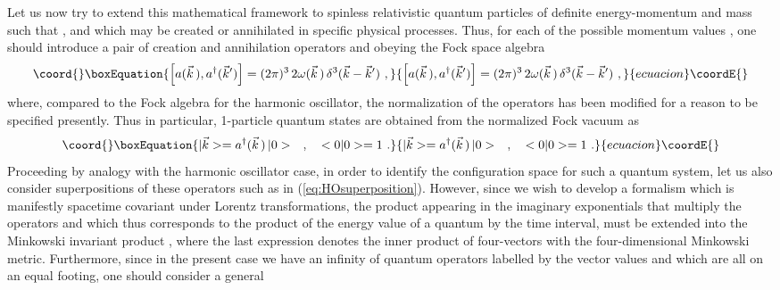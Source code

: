 \documentclass[a4paper,11pt]{article}
\begin{document}
Let us now try to extend this mathematical framework to spinless 
re\-la\-tivistic
quantum particles of definite energy-momentum \coordHE{}
and mass \coordHE{} such that \coordHE{},
and which may be created or annihilated in specific physical processes. 
Thus, for each of the possible
momentum values \coordHE{}, one should introduce a pair of creation
and annihilation operators \coordHE{} and \coordHE{}
obeying the Fock space algebra
\begin{equation}\coord{}\boxEquation{
\left[a(\vec{k}\,),a^\dagger(\vec{k}')\right]=
(2\pi)^3\,2\omega(\vec{k}\,)\,\delta^{3}(\vec{k}-\vec{k}')\ ,
\label{eq:Fockparticle}
}{
\left[a(\vec{k}\,),a^\dagger(\vec{k}')\right]=
(2\pi)^3\,2\omega(\vec{k}\,)\,\delta^{3}(\vec{k}-\vec{k}')\ ,
}{ecuacion}\coordE{}\end{equation}
where, compared to the Fock algebra for the harmonic oscillator,
the normalization of the operators has been modified for a reason
to be specified presently. Thus in particular, 1-particle quantum states
are obtained from the normalized Fock vacuum \coordHE{} as
\begin{equation}\coord{}\boxEquation{
|\vec{k}>=a^\dagger(\vec{k}\,)\,|0>\ \ \ ,\ \ \ 
<0|0>=1\ .
}{
|\vec{k}>=a^\dagger(\vec{k}\,)\,|0>\ \ \ ,\ \ \ 
<0|0>=1\ .
}{ecuacion}\coordE{}\end{equation}
Proceeding by analogy with the harmonic oscillator case, in order
to identify the configuration space for such a quantum system,
let us also consider superpositions of these operators such as in
(\ref{eq:HOsuperposition}). However, since we wish to develop a
formalism which is manifestly spacetime covariant under Lorentz
transformations, the product \myHighlight{$\omega t$}\coordHE{} appearing in the imaginary
exponentials that multiply the operators and which thus corresponds to
the product of the energy value of a quantum by the time interval,
must be extended into the Minkowski invariant product 
\myHighlight{$\omega(\vec{k}\,)t-\vec{k}\cdot\vec{x}=k\cdot x$}\coordHE{}, where the last
expression denotes the inner product of four-vectors with the 
four-dimensional Minkowski metric. Furthermore, since in the present case
we have an infinity of quantum operators labelled by the vector values
\myHighlight{$\vec{k}$}\coordHE{} and which are all on an equal footing, one should consider a general
\end{document}
